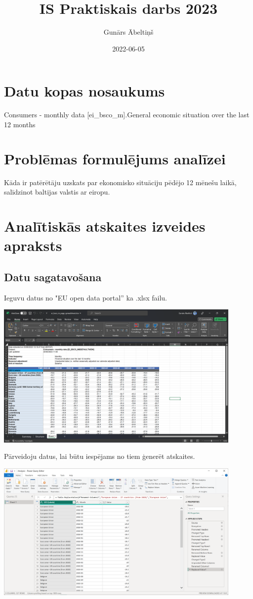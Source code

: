 \documentclass{article}
\title{IS Praktiskais darbs 2023}
\author{Gunārs Ābeltiņš}
\date{2022-06-05}
\begin{document}
\maketitle

\section{Datu kopas nosaukums}
Consumers - monthly data [ei\_bsco\_m].General economic situation over the last 12 months

\section{Problēmas formulējums analīzei}
Kāda ir patērētāju uzskats par ekonomisko situāciju pēdējo 12 mēnešu laikā, salīdzinot baltijas valstis ar eiropu.

\section{Analītiskās atskaites izveides apraksts}
\subsection{Datu sagatavošana}
Ieguvu datus no "EU open data portal” ka .xlsx failu.

\includegraphics[width=0.9\textwidth, center]{Excel}

Pārveidoju datus, lai būtu iespējams no tiem ģenerēt atskaites.

\includegraphics[width=0.9\textwidth, center]{Transform}
\end{document}

